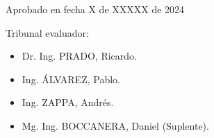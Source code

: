 Aprobado en fecha X de XXXXX de 2024

\vspace{2cm}

Tribunal evaluador:

\begin{itemize}

\item Dr. Ing. PRADO, Ricardo. %
\item Ing. ÁLVAREZ, Pablo. %
\item Ing. ZAPPA, Andrés. %
\item Mg. Ing. BOCCANERA, Daniel (Suplente). %
\end{itemize}

